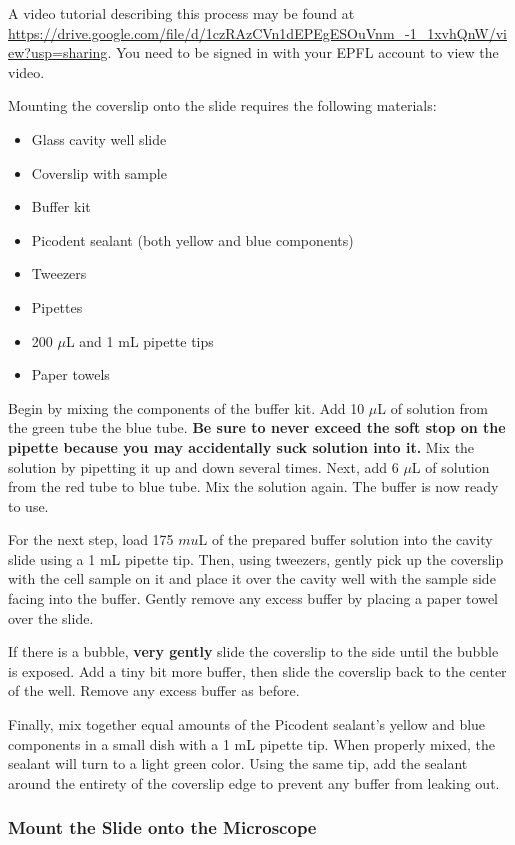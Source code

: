 \documentclass[10pt,a4paper,oneside]{book}
\begin{document}
A video tutorial describing this process may be found at \url{https://drive.google.com/file/d/1czRAzCVn1dEPEgESOuVnm_-1_1xvhQnW/view?usp=sharing}. You need to be signed in with your EPFL account to view the video.

Mounting the coverslip onto the slide requires the following materials:

\begin{itemize}
    \item{Glass cavity well slide}
    \item{Coverslip with sample}
    \item{Buffer kit}
    \item{Picodent sealant (both yellow and blue components)}
    \item{Tweezers}
    \item{Pipettes}
    \item{200 $\mu$L and 1 mL pipette tips}
    \item{Paper towels}
\end{itemize}

Begin by mixing the components of the buffer kit. Add 10 $\mu$L of solution from the green tube the blue tube. \textbf{Be sure to never exceed the soft stop on the pipette because you may accidentally suck solution into it.} Mix the solution by pipetting it up and down several times. Next, add 6 $\mu$L of solution from the red tube to blue tube. Mix the solution again. The buffer is now ready to use.

For the next step, load 175 $mu$L of the prepared buffer solution into the cavity slide using a 1 mL pipette tip. Then, using tweezers, gently pick up the coverslip with the cell sample on it and place it over the cavity well with the sample side facing into the buffer. Gently remove any excess buffer by placing a paper towel over the slide.

If there is a bubble, \textbf{very gently} slide the coverslip to the side until the bubble is exposed. Add a tiny bit more buffer, then slide the coverslip back to the center of the well. Remove any excess buffer as before.

Finally, mix together equal amounts of the Picodent sealant's yellow and blue components in a small dish with a 1 mL pipette tip. When properly mixed, the sealant will turn to a light green color. Using the same tip, add the sealant around the entirety of the coverslip edge to prevent any buffer from leaking out.

\subsubsection{Mount the Slide onto the Microscope}
\end{document}
